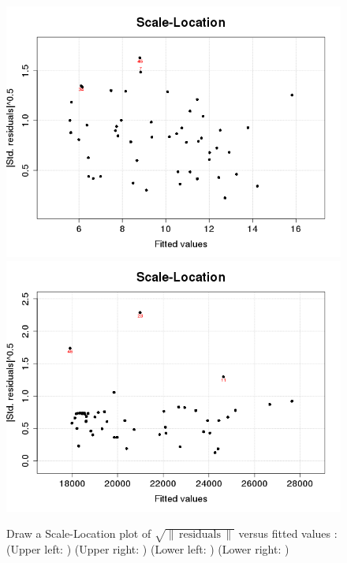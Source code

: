 \begin{figure}[p]
\begin{center}
    \includegraphics[scale=0.4]{imgOT/model1-drawScaleLocation.png}\hspace*{1cm}
	\includegraphics[scale=0.4]{imgOT/model2-drawScaleLocation.png}\\
  \end{center}
  \caption{Draw a Scale-Location plot of $\sqrt{\| \,\text{residuals}\,\|}$ versus fitted values :\newline
  (Upper left: \textbf{\color{black}{model1: R output}}) (Upper right: \textbf{\color{black}{model2: R output}}) \newline
  (Lower left: \textbf{\color{blue}{model1: python output}})  (Lower right: \textbf{\color{blue}{model2: python output}}) }
\end{figure}

